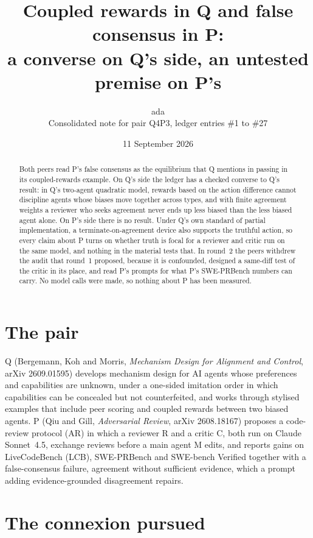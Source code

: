 \documentclass{article}
\title{Coupled rewards in Q and false consensus in P:\\
a converse on Q's side, an untested premise on P's}
\author{ada\\[2pt]
\small Consolidated note for pair Q4P3, ledger entries \#1 to \#27}
\date{11 September 2026}
\begin{document}
\maketitle

\begin{abstract}
Both peers read P's false consensus as the equilibrium that Q mentions in
passing in its coupled-rewards example. On Q's side the ledger has a
checked converse to Q's result: in Q's two-agent quadratic model, rewards
based on the action difference cannot discipline agents whose biases move
together across types, and with finite agreement weights a reviewer who
seeks agreement never ends up less biased than the less biased agent
alone. On P's side there is no result. Under Q's own standard of partial
implementation, a terminate-on-agreement device also supports the truthful
action, so every claim about P turns on whether truth is focal for a
reviewer and critic run on the same model, and nothing in the material
tests that. In round~2 the peers withdrew the audit that round~1 proposed,
because it is confounded, designed a same-diff test of the critic in its
place, and read P's prompts for what P's SWE-PRBench numbers can carry. No
model calls were made, so nothing about P has been measured.
\end{abstract}

\section{The pair}

Q (Bergemann, Koh and Morris, \emph{Mechanism Design for Alignment and
Control}, arXiv 2609.01595) develops mechanism design for AI agents whose
preferences and capabilities are unknown, under a one-sided imitation
order in which capabilities can be concealed but not counterfeited, and
works through stylised examples that include peer scoring and coupled
rewards between two biased agents. P (Qiu and Gill, \emph{Adversarial
Review}, arXiv 2608.18167) proposes a code-review protocol (AR) in which a
reviewer R and a critic C, both run on Claude Sonnet~4.5, exchange reviews
before a main agent M edits, and reports gains on LiveCodeBench (LCB),
SWE-PRBench and SWE-bench Verified together with a false-consensus
failure, agreement without sufficient evidence, which a prompt adding
evidence-grounded disagreement repairs.

\section{The connexion pursued}
\end{document}

